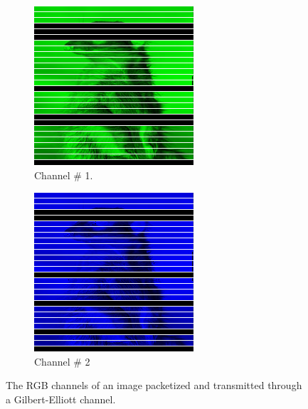 \documentclass{beamer}
\begin{document}
\begin{frame}
\begin{figure}[H]
\begin{subfigure}{.25\linewidth}
			\includegraphics[width = \linewidth]{Figures/gridgaftertrans.png}
			\caption{Channel \# 1.}
		\end{subfigure}%
		\hspace{2em}%
		\begin{subfigure}{.25\linewidth}
			\centering
			\includegraphics[width = \linewidth]{Figures/gridbaftertrans.png}
			\caption{Channel \# 2}
		\end{subfigure}
		\caption{The RGB channels of an image packetized and transmitted through a Gilbert-Elliott channel.}
	\end{figure}
\end{frame}
\end{document}
